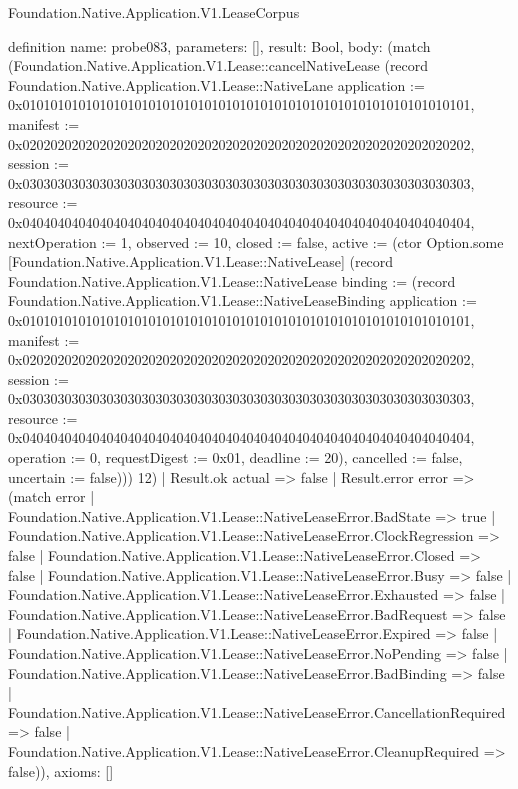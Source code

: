 \begin{lexlean}{Foundation.Native.Application.V1.LeaseCorpus}
\begin{semanticmodule}
definition{
  name: probe083,
  parameters: [],
  result: Bool,
  body: (match (Foundation.Native.Application.V1.Lease::cancelNativeLease (record Foundation.Native.Application.V1.Lease::NativeLane {application := 0x0101010101010101010101010101010101010101010101010101010101010101, manifest := 0x0202020202020202020202020202020202020202020202020202020202020202, session := 0x0303030303030303030303030303030303030303030303030303030303030303, resource := 0x0404040404040404040404040404040404040404040404040404040404040404, nextOperation := 1, observed := 10, closed := false, active := (ctor Option.some [Foundation.Native.Application.V1.Lease::NativeLease] (record Foundation.Native.Application.V1.Lease::NativeLease {binding := (record Foundation.Native.Application.V1.Lease::NativeLeaseBinding {application := 0x0101010101010101010101010101010101010101010101010101010101010101, manifest := 0x0202020202020202020202020202020202020202020202020202020202020202, session := 0x0303030303030303030303030303030303030303030303030303030303030303, resource := 0x0404040404040404040404040404040404040404040404040404040404040404, operation := 0, requestDigest := 0x01, deadline := 20}), cancelled := false, uncertain := false}))}) 12)
    | Result.ok actual => false
    | Result.error error => (match error
      | Foundation.Native.Application.V1.Lease::NativeLeaseError.BadState => true
      | Foundation.Native.Application.V1.Lease::NativeLeaseError.ClockRegression => false
      | Foundation.Native.Application.V1.Lease::NativeLeaseError.Closed => false
      | Foundation.Native.Application.V1.Lease::NativeLeaseError.Busy => false
      | Foundation.Native.Application.V1.Lease::NativeLeaseError.Exhausted => false
      | Foundation.Native.Application.V1.Lease::NativeLeaseError.BadRequest => false
      | Foundation.Native.Application.V1.Lease::NativeLeaseError.Expired => false
      | Foundation.Native.Application.V1.Lease::NativeLeaseError.NoPending => false
      | Foundation.Native.Application.V1.Lease::NativeLeaseError.BadBinding => false
      | Foundation.Native.Application.V1.Lease::NativeLeaseError.CancellationRequired => false
      | Foundation.Native.Application.V1.Lease::NativeLeaseError.CleanupRequired => false)),
  axioms: []
}


\end{semanticmodule}
\end{lexlean}
